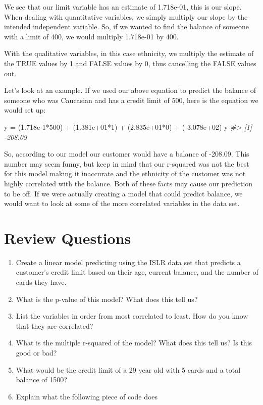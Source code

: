 \documentclass[
]{book}
\newenvironment{Shaded}{\begin{snugshade}}{\end{snugshade}}
\newcommand{\CommentTok}[1]{\textcolor[rgb]{0.56,0.35,0.01}{\textit{#1}}}
\newcommand{\DecValTok}[1]{\textcolor[rgb]{0.00,0.00,0.81}{#1}}
\newcommand{\FloatTok}[1]{\textcolor[rgb]{0.00,0.00,0.81}{#1}}
\newcommand{\NormalTok}[1]{#1}
\newcommand{\OtherTok}[1]{\textcolor[rgb]{0.56,0.35,0.01}{#1}}
\newcommand{\SpecialCharTok}[1]{\textcolor[rgb]{0.00,0.00,0.00}{#1}}
\begin{document}
We see that our limit variable has an estimate of 1.718e-01, this is our slope. When dealing with quantitative variables, we simply multiply our slope by the intended independent variable. So, if we wanted to find the balance of someone with a limit of 400, we would multiply 1.718e-01 by 400.

With the qualitative variables, in this case ethnicity, we multiply the estimate of the TRUE values by 1 and FALSE values by 0, thus cancelling the FALSE values out.

Let's look at an example. If we used our above equation to predict the balance of someone who was Caucasian and has a credit limit of 500, here is the equation we would set up:

\begin{Shaded}
\begin{Highlighting}[]
\NormalTok{y }\OtherTok{=}\NormalTok{ (}\FloatTok{1.718e{-}1}\SpecialCharTok{*}\DecValTok{500}\NormalTok{) }\SpecialCharTok{+}\NormalTok{ (}\FloatTok{1.381e+01}\SpecialCharTok{*}\DecValTok{1}\NormalTok{) }\SpecialCharTok{+}\NormalTok{ (}\FloatTok{2.835e+01}\SpecialCharTok{*}\DecValTok{0}\NormalTok{) }\SpecialCharTok{+}\NormalTok{ (}\SpecialCharTok{{-}}\FloatTok{3.078e+02}\NormalTok{)}
\NormalTok{y}
\CommentTok{\#\textgreater{} [1] {-}208.09}
\end{Highlighting}
\end{Shaded}

So, according to our model our customer would have a balance of -208.09. This number may seem funny, but keep in mind that our r-squared was not the best for this model making it inaccurate and the ethnicity of the customer was not highly correlated with the balance. Both of these facts may cause our prediction to be off. If we were actually creating a model that could predict balance, we would want to look at some of the more correlated variables in the data set.

\hypertarget{review-questions-1}{%
\section{Review Questions}\label{review-questions-1}}

\begin{enumerate}
\def\labelenumi{\arabic{enumi})}
\item
  Create a linear model predicting using the ISLR data set that predicts a customer's credit limit based on their age, current balance, and the number of cards they have.
\item
  What is the p-value of this model? What does this tell us?
\item
  List the variables in order from most correlated to least. How do you know that they are correlated?
\item
  What is the multiple r-squared of the model? What does this tell us? Is this good or bad?
\item
  What would be the credit limit of a 29 year old with 5 cards and a total balance of 1500?
\item
  Explain what the following piece of code does
\end{enumerate}
\end{document}
